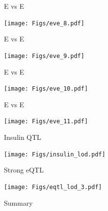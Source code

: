 \documentclass[12pt]{article}
\newcommand{\headsize}{\fontsize{35}{35} \selectfont}
\begin{document}
\newpage

\headsize \color{myyellow}
\hfill \begin{minipage}{5.75in}
\centering
E vs E
\end{minipage}

\vfill

\centerline{\texttt{[image: Figs/eve\_8.pdf]}}


\newpage

\headsize \color{myyellow}
\hfill \begin{minipage}{5.75in}
\centering
E vs E
\end{minipage}

\vfill

\centerline{\texttt{[image: Figs/eve\_9.pdf]}}


\newpage

\headsize \color{myyellow}
\hfill \begin{minipage}{5.75in}
\centering
E vs E
\end{minipage}

\vfill

\centerline{\texttt{[image: Figs/eve\_10.pdf]}}


\newpage

\headsize \color{myyellow}
\hfill \begin{minipage}{5.75in}
\centering
E vs E
\end{minipage}

\vfill

\centerline{\texttt{[image: Figs/eve\_11.pdf]}}




\newpage


\headsize \color{myyellow}
\hfill \begin{minipage}{5.75in}
\centering
Insulin QTL
\end{minipage}

\vfill

\centerline{\texttt{[image: Figs/insulin\_lod.pdf]}}


\newpage

\headsize \color{myyellow}
\hfill \begin{minipage}{5.75in}
\centering
Strong eQTL
\end{minipage}

\vfill

\centerline{\texttt{[image: Figs/eqtl\_lod\_3.pdf]}}



\newpage

\headsize \color{myyellow}
\hfill \begin{minipage}{5.75in}
\centering
Summary
\end{minipage}
\end{document}
